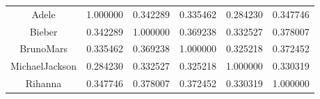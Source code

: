 \documentclass{article}
\begin{document}
\begin{table}[ht]
\begin{subtable}{\textwidth}
\begin{tabular}{|c|c|c|c|c|p{1.8cm}|}
\hline
Adele          &  1.000000 &  0.342289 &   0.335462 &        0.284230 &  0.347746 \\
Bieber         &  0.342289 &  1.000000 &   0.369238 &        0.332527 &  0.378007 \\
BrunoMars      &  0.335462 &  0.369238 &   1.000000 &        0.325218 &  0.372452 \\
MichaelJackson &  0.284230 &  0.332527 &   0.325218 &        1.000000 &  0.330319 \\
Rihanna        &  0.347746 &  0.378007 &   0.372452 &        0.330319 &  1.000000 \\
\hline
\end{tabular}
\end{subtable}
\end{table}
\end{document}

